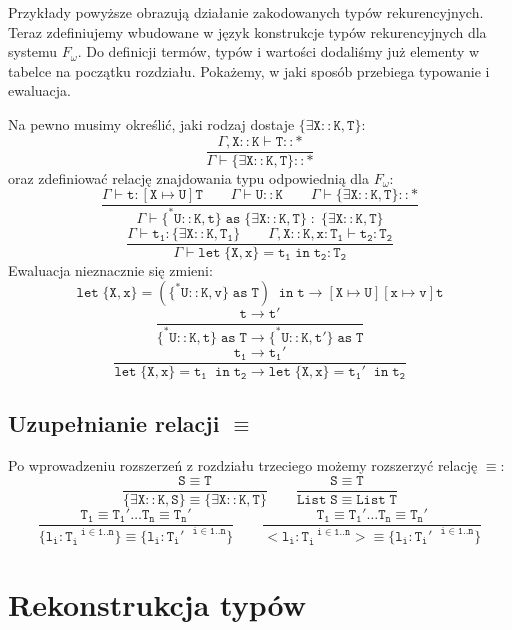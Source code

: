 \documentclass[11pt,leqno]{article}
\begin{document}
\normalsize{
Przykłady powyższe obrazują działanie zakodowanych typów rekurencyjnych. Teraz zdefiniujemy wbudowane w język konstrukcje typów rekurencyjnych dla systemu $F_\omega$. Do definicji termów, typów i wartości dodaliśmy już elementy w tabelce na początku rozdziału. Pokażemy, w jaki sposób przebiega typowanie i ewaluacja. \\
}


Na pewno musimy określić, jaki rodzaj dostaje $\mathtt{\{\exists X::K,T\}}$:
 	\[\mathtt{ \frac{\Gamma,X::K \vdash T::\ast}{\Gamma \vdash \{\exists X::K,T\}::\ast}
		}
	\]
oraz zdefiniować relację znajdowania typu odpowiednią dla $F_\omega$:
 	\[\mathtt{ \frac{\Gamma \vdash t:[X \mapsto U]T\hspace{2em}\Gamma \vdash U::K \hspace{2em}\Gamma \vdash \{\exists X::K,T\}::\ast}{\Gamma \vdash \{^*U::K,t\}\;as\;\{\exists X::K,T\} \; : \; \{\exists X::K,T\}}
		}
	\]
 	\[\mathtt{ \frac{\Gamma \vdash t_1:\{\exists X::K,T_1\}\hspace{2em}\Gamma,X::K,x:T_1 \vdash t_2:T_2}{\Gamma \vdash let\;\{X,x\}=t_1\;in\;t_2:T_2}
		}
	\]
Ewaluacja nieznacznie się zmieni:
 	\[\mathtt{ let\;\{X,x\}=(\{^*U::K,v\}\;as\;T)\;\;in\;t \longrightarrow [X \mapsto U][x \mapsto v]t
		}
	\]
 	\[\mathtt{ \frac{t \longrightarrow t'}{\{^*U::K,t\}\;as\;T \longrightarrow \{^*U::K,t'\}\;as\;T}
		}
	\]
 	\[\mathtt{ \frac{t_1\longrightarrow t_1'}{let\;\{X,x\}=t_1\;\;in\;t_2 \longrightarrow let\;\{X,x\}=t_1'\;\;in\;t_2}
		}
	\]

\subsection{Uzupełnianie relacji $\mathtt{\equiv}$}

Po wprowadzeniu rozszerzeń z rozdziału trzeciego możemy rozszerzyć relację $\mathtt{\equiv}$:
        \[\mathtt{ \frac{S \equiv T}{\{\exists X::K,S\} \equiv \{\exists X::K,T\}}
                   \qquad
                   \frac{S \equiv T}{List\;S \equiv List\;T}
		}
	\]
        \[\mathtt{ \frac{T_1 \equiv T_1' \dots T_n \equiv T_n'}{\{l_i:T_i^{\;\;\;i \in 1..n}\} \equiv \{l_i:T_i'^{\;\;\;i \in 1..n}\}}
                   \qquad
                   \frac{T_1 \equiv T_1' \dots T_n \equiv T_n'}{<l_i:T_i^{\;\;\;i \in 1..n}> \equiv \{l_i:T_i'^{\;\;\;i \in 1..n}\}}
		}
	\]
\section{Rekonstrukcja typów}
\end{document}
